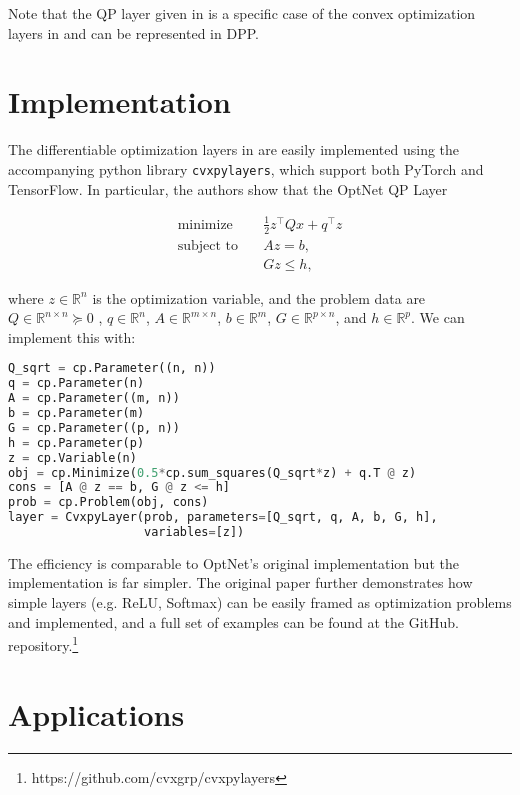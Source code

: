 \documentclass{article}
\begin{document}
Note that the QP layer given in \citet{optnet} is a specific case of the convex optimization layers in \citet{differentiableconvexoptimizationlayers} and can be represented in DPP.

\section{Implementation}

The differentiable optimization layers in \citet{differentiableconvexoptimizationlayers} are easily implemented using the accompanying python library \texttt{cvxpylayers}, which support both PyTorch and TensorFlow. In particular, the authors show that the OptNet QP Layer 

\[
\begin{aligned}
\text{minimize} \quad & \frac{1}{2} z^\top Q x + q^\top z \\
\text{subject to} \quad & Az = b, \\
                        & Gz \leq h,
\end{aligned}
\]

where \( z \in \mathbb{R}^n \) is the optimization variable, and the problem data are \( Q \in \mathbb{R}^{n \times n} \succeq 0\) , \( q \in \mathbb{R}^n \), \( A \in \mathbb{R}^{m \times n} \), \( b \in \mathbb{R}^m \), \( G \in \mathbb{R}^{p \times n} \), and \( h \in \mathbb{R}^p \). We can implement this with:

\begin{lstlisting}[language=Python]
Q_sqrt = cp.Parameter((n, n))
q = cp.Parameter(n)
A = cp.Parameter((m, n))
b = cp.Parameter(m)
G = cp.Parameter((p, n))
h = cp.Parameter(p)
z = cp.Variable(n)
obj = cp.Minimize(0.5*cp.sum_squares(Q_sqrt*z) + q.T @ z)
cons = [A @ z == b, G @ z <= h]
prob = cp.Problem(obj, cons)
layer = CvxpyLayer(prob, parameters=[Q_sqrt, q, A, b, G, h], 
                   variables=[z])
\end{lstlisting}

The efficiency is comparable to OptNet's original implementation but the implementation is far simpler. The original paper \citet{differentiableconvexoptimizationlayers} further demonstrates how simple layers (e.g. ReLU, Softmax) can be easily framed as optimization problems and implemented, and a full set of examples can be found at the GitHub. repository.\footnote{https://github.com/cvxgrp/cvxpylayers}

\section{Applications}
\end{document}
